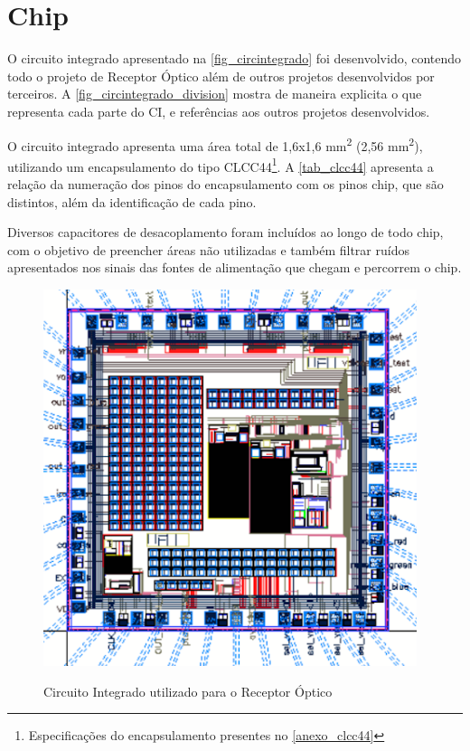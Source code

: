\section{Chip}

O circuito integrado apresentado na \autoref{fig_circintegrado} foi desenvolvido, contendo todo o projeto de Receptor Óptico além de outros projetos desenvolvidos por terceiros. A \autoref{fig_circintegrado_division} mostra de maneira explicita o que representa cada parte do CI, e referências aos outros projetos desenvolvidos.

O circuito integrado apresenta uma área total de 1,6x1,6 mm\textsuperscript{2} (2,56 mm\textsuperscript{2}), utilizando um encapsulamento do tipo CLCC44\footnote{Especificações do encapsulamento presentes no \autoref{anexo_clcc44}}. A \autoref{tab_clcc44} apresenta a relação da numeração dos pinos do encapsulamento com os pinos chip, que são distintos, além da identificação de cada pino.

Diversos capacitores de desacoplamento foram incluídos ao longo de todo chip, com o objetivo de preencher áreas não utilizadas e também filtrar ruídos apresentados nos sinais das fontes de alimentação que chegam e percorrem o chip. 

\begin{figure}[!h]
 \centering
    \caption{Circuito Integrado utilizado para o Receptor Óptico} 
    \includegraphics[scale=0.5]{Projeto/Layout/Imagens/CircuitoIntegrado.png}
    \label{fig_circintegrado}
\end{figure}

